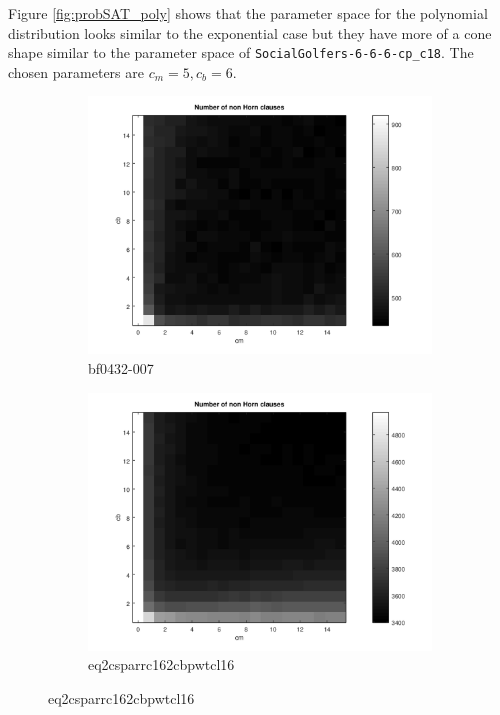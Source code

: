 \documentclass[12pt,a4paper]{article}
\begin{document}
Figure \ref{fig:probSAT_poly} shows that the parameter space for the polynomial distribution looks similar to the exponential case but they have more of a cone shape similar to the parameter space of \texttt{SocialGolfers-6-6-6-cp\_c18}. The chosen parameters are $c_m = 5, c_b=6$.
\begin{figure}[H]
  \centering
  \begin{subfigure}{0.45\textwidth}
    \includegraphics[width=\textwidth]{probSAT/probSATexp_bf0432-007[SKIP=0].png}
    \caption{bf0432-007}
  \end{subfigure}
  \begin{subfigure}{0.45\textwidth}
    \includegraphics[width=\textwidth]{probSAT/probSATexp_eq2csparrc162cbpwtcl16[SKIP=0].png}
    \caption{eq2csparrc162cbpwtcl16}
  \end{subfigure}
  

\end{figure}
\end{document}
